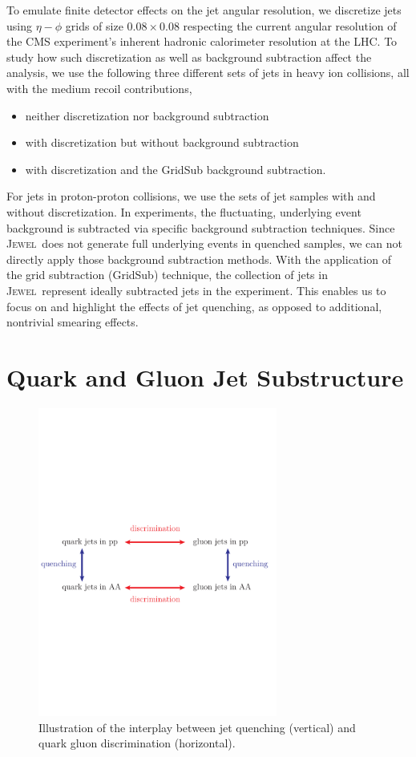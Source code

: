 \documentclass[notoc,preprintnumbers]{JHEP3}
\newcommand{\jw}{\textsc{Jewel}~}
\begin{document}
To emulate finite detector effects on the jet angular resolution, we discretize jets using $\eta-\phi$ grids of size $0.08 \times 0.08$ respecting the current angular resolution of the CMS experiment's inherent hadronic calorimeter resolution at the LHC. To study how such discretization as well as background subtraction affect the analysis, we use the following three different sets of jets in heavy ion collisions, all with the medium recoil contributions,
\begin{itemize}
	\item neither discretization nor background subtraction
	\item with discretization but without background subtraction
	\item with discretization and the GridSub \cite{KunnawalkamElayavalli:2017hxo} background subtraction.
\end{itemize}
For jets in proton-proton collisions, we use the sets of jet samples with and without discretization. In experiments, the fluctuating, underlying event background is subtracted via specific background subtraction techniques. Since \jw does not generate full underlying events in quenched samples, we can not directly apply those background subtraction methods. With the application of the grid subtraction (GridSub) technique, the collection of jets in \jw represent ideally subtracted jets in the experiment. This enables us to focus on and highlight the effects of jet quenching, as opposed to additional, nontrivial smearing effects.

\section{Quark and Gluon Jet Substructure}
\label{sec:qg}
\begin{figure}[t]
	   \centering
	   \includegraphics[width=0.7\textwidth]{Fig1}
	   \caption{Illustration of the interplay between jet quenching (vertical) and quark gluon discrimination (horizontal). }
	   \label{fig:quenching_discrimination}
\end{figure}
\end{document}
